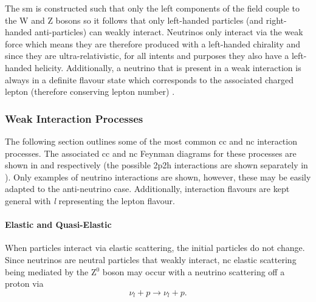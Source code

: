 The \gls{sm} is constructed such that only the left components of the field couple to the W and Z bosons so it follows that only left-handed particles (and right-handed anti-particles) can weakly interact. Neutrinos only interact via the weak force which means they are therefore produced with a left-handed chirality and since they are ultra-relativistic, for all intents and purposes they also have a left-handed helicity. Additionally, a neutrino that is present in a weak interaction is always in a definite flavour state which corresponds to the associated charged lepton (therefore conserving lepton number) \cite{Quarks_and_Leptons:_An_Introductor_Course_in_Modern_Particle_Physics_book}.

\subsubsection{Weak Interaction Processes}

The following section outlines some of the most common \gls{cc} and \gls{nc} interaction processes. The associated \gls{cc} and \gls{nc} Feynman diagrams for these processes are shown in  and  respectively (the possible \gls{2p2h} interactions are shown separately in ). Only examples of neutrino interactions are shown, however, these may be easily adapted to the anti-neutrino case. Additionally, interaction flavours are kept general with \textit{l} representing the lepton flavour.

\paragraph{Elastic and Quasi-Elastic}
When particles interact via elastic scattering, the initial particles do not change. Since neutrinos are neutral particles that weakly interact, \gls{nc} elastic scattering being mediated by the Z$^0$ boson may occur with a neutrino scattering off a proton via
\begin{equation}
    \nu_l + p \rightarrow \nu_l + p.
\end{equation}

